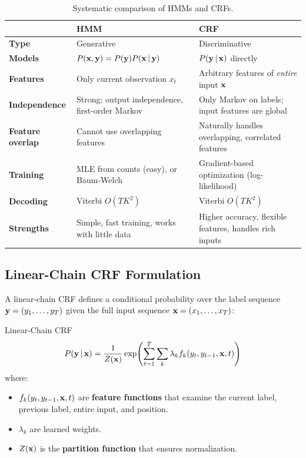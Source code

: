 \begin{table}[H]
\centering
\caption{Systematic comparison of HMMs and CRFs.}
\label{tab:hmm_vs_crf}
\begin{tabularx}{\textwidth}{>{\bfseries}l X X}
\toprule
& \textbf{HMM} & \textbf{CRF} \\
\midrule
Type & Generative & Discriminative \\
Models & $P(\mathbf{x}, \mathbf{y}) = P(\mathbf{y}) P(\mathbf{x} \,|\, \mathbf{y})$ & $P(\mathbf{y} \,|\, \mathbf{x})$ directly \\
Features & Only current observation $x_t$ & Arbitrary features of \emph{entire} input $\mathbf{x}$ \\
Independence & Strong: output independence, first-order Markov & Only Markov on labels; input features are global \\
Feature overlap & Cannot use overlapping features & Naturally handles overlapping, correlated features \\
Training & MLE from counts (easy), or Baum-Welch & Gradient-based optimization (log-likelihood) \\
Decoding & Viterbi $O(TK^2)$ & Viterbi $O(TK^2)$ \\
Strengths & Simple, fast training, works with little data & Higher accuracy, flexible features, handles rich inputs \\
\bottomrule
\end{tabularx}
\end{table}

\subsection{Linear-Chain CRF Formulation}

A linear-chain CRF defines a conditional probability over the label sequence
$\mathbf{y} = (y_1, \ldots, y_T)$ given the full input sequence
$\mathbf{x} = (x_1, \ldots, x_T)$:

\begin{mathresult}{Linear-Chain CRF}
\begin{equation}
P(\mathbf{y} \,|\, \mathbf{x}) = \frac{1}{Z(\mathbf{x})} \exp\!\left(\sum_{t=1}^{T} \sum_{k} \lambda_k f_k(y_t, y_{t-1}, \mathbf{x}, t)\right)
\label{eq:crf}
\end{equation}
where:
\begin{itemize}
    \item $f_k(y_t, y_{t-1}, \mathbf{x}, t)$ are \textbf{feature functions} that
          examine the current label, previous label, entire input, and position.
    \item $\lambda_k$ are learned weights.
    \item $Z(\mathbf{x})$ is the \textbf{partition function} that ensures normalization.
\end{itemize}
\end{mathresult}

